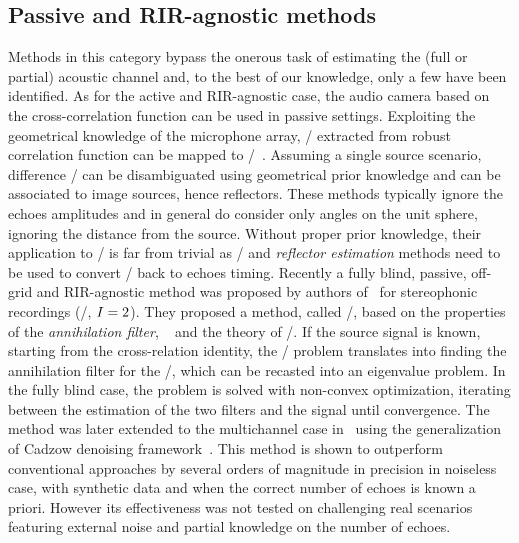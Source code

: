 \subsection{Passive and RIR-agnostic methods}
Methods in this category bypass the onerous task of estimating the (full or partial) acoustic channel and, to the best of our knowledge, only a few have been identified.
As for the active and RIR-agnostic case, the audio camera based on the cross-correlation function can be used in passive settings.
Exploiting the geometrical knowledge of the microphone array, \TDOAs/ extracted from robust correlation function can be mapped to \DOAs/~.
Assuming a single source scenario, difference \DOAs/ can be disambiguated using geometrical prior knowledge and can be associated to image sources, hence reflectors.
These methods typically ignore the echoes amplitudes and in general do consider only angles on the unit sphere, ignoring the distance from the source.
Without proper prior knowledge, their application to \AER/ is far from trivial as \RooGE/ and \textit{reflector estimation} methods need to be used to convert \DOAs/ back to echoes timing.
\mynewline
Recently a fully blind, passive, off-grid and RIR-agnostic method was proposed by authors of~ for stereophonic recordings (\ie/, $I=2$).
They proposed a method, called \MULAN/, based on the properties of the \textit{annihilation filter},
~ and the theory of \FRI/.
If the source signal is known, starting from the cross-relation identity, the \AER/ problem translates into finding the annihilation filter for the \RIRs/, which can be recasted into an eigenvalue problem.
In the fully blind case, the problem is solved with non-convex optimization, iterating between the estimation of the two filters and the signal until convergence.
The method was later extended to the multichannel case in~ using the generalization of Cadzow denoising framework~.
This method is shown to outperform conventional approaches by several orders of magnitude in precision in noiseless case, with synthetic data and when the correct number of echoes is known a priori.
However its effectiveness was not tested on challenging real scenarios featuring external noise and partial knowledge on the number of echoes.

